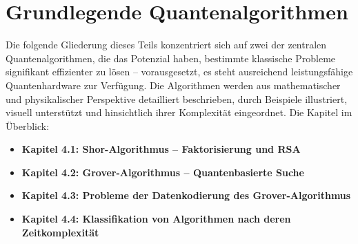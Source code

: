 \chapter{Grundlegende Quantenalgorithmen}
\label{basic_algorithms} %



\abstract{}
Die folgende Gliederung dieses Teils konzentriert sich auf zwei der zentralen Quantenalgorithmen, die das Potenzial haben, bestimmte klassische Probleme signifikant effizienter zu lösen – vorausgesetzt, es steht ausreichend leistungsfähige Quantenhardware zur Verfügung. Die Algorithmen werden aus mathematischer und physikalischer Perspektive detailliert beschrieben, durch Beispiele illustriert, visuell unterstützt und hinsichtlich ihrer Komplexität eingeordnet. Die Kapitel im Überblick:

\begin{itemize}
\item \textbf{Kapitel 4.1: Shor-Algorithmus – Faktorisierung und RSA}
\item \textbf{Kapitel 4.2: Grover-Algorithmus – Quantenbasierte Suche}
\item \textbf{Kapitel 4.3: Probleme der Datenkodierung des Grover-Algorithmus}
\item \textbf{Kapitel 4.4: Klassifikation von Algorithmen nach deren Zeitkomplexität}
\end{itemize}

